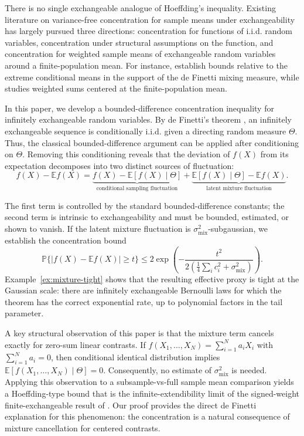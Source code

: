 \documentclass[11pt]{article}
\newcommand{\E}{\mathbb{E}}
\newcommand{\Pbb}{\mathbb{P}}
\theoremstyle{definition}
\theoremstyle{remark}
\begin{document}
There is no single exchangeable analogue of Hoeffding's inequality. Existing literature on variance-free concentration for sample means under exchangeability has largely pursued three directions: concentration for functions of i.i.d. random variables, concentration under structural assumptions on the function, and concentration for weighted sample means of exchangeable random variables around a finite-population mean. For instance, \citet{gottschling2026hoeffding} establish bounds relative to the extreme conditional means in the support of the de Finetti mixing measure, while \citet{foygel2024hoeffding} studies weighted sums centered at the finite-population mean.

In this paper, we develop a bounded-difference concentration inequality for infinitely exchangeable random variables. By de Finetti's theorem \citep{definetti1937}, an infinitely exchangeable sequence is conditionally i.i.d. given a directing random measure $\Theta$. Thus, the classical bounded-difference argument can be applied after conditioning on $\Theta$. Removing this conditioning reveals that the deviation of $f(X)$ from its expectation decomposes into two distinct sources of fluctuation:$$ f(X)-\E f(X) = \underbrace{f(X)-\E[f(X)\mid \Theta]}_{\text{conditional sampling fluctuation}} + \underbrace{\E[f(X)\mid \Theta]-\E f(X)}_{\text{latent mixture fluctuation}}. $$

The first term is controlled by the standard bounded-difference constants; the second term is intrinsic to exchangeability and must be bounded, estimated, or shown to vanish. If the latent mixture fluctuation is $\sigma_{\mathrm{mix}}^2$-subgaussian, we establish the concentration bound
$$ \Pbb\{|f(X)-\E f(X)|\ge t\} \le 2\exp\!\left( -\frac{t^2}{ 2\left(\frac{1}{4}\sum_i c_i^2+\sigma_{\mathrm{mix}}^2\right)} \right). $$
Example~\ref{ex:mixture-tight} shows that the resulting effective proxy is tight at the Gaussian scale: there are infinitely exchangeable Bernoulli laws for which the theorem has the correct exponential rate, up to polynomial factors in the tail parameter.

A key structural observation of this paper is that the mixture term cancels exactly for zero-sum linear contrasts. If $f(X_1,\ldots,X_N)=\sum_{i=1}^N a_iX_i$ with $\sum_{i=1}^N a_i=0$, then conditional identical distribution implies $\E[f(X_1,\ldots,X_N)\mid\Theta] = 0$. Consequently, no estimate of $\sigma_{\mathrm{mix}}^2$ is needed. Applying this observation to a subsample-vs-full sample mean comparison yields a Hoeffding-type bound that is the infinite-extendibility limit of the signed-weight finite-exchangeable result of \citet{foygel2024hoeffding}. Our proof provides the direct de Finetti explanation for this phenomenon: the concentration is a natural consequence of mixture cancellation for centered contrasts.
\end{document}

